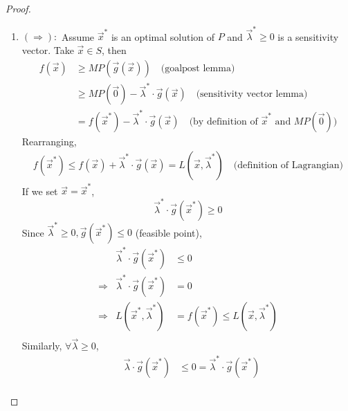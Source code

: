 \documentclass[11pt,a4paper]{article}
\begin{document}
\begin{proof}\quad
    \begin{enumerate}[$\bullet$]
        \item $(\Rightarrow):$ Assume $\vec{x}^*$ is an optimal solution of $P$ and $\vec{\lambda}^*\geq 0$ is a sensitivity vector. Take $\vec{x}\in S$, then
        \begin{equation}
            \begin{aligned}
                f(\vec{x})&\geq MP(\vec{g}(\vec{x}))\quad \text{(goalpost lemma)}\\
                &\geq MP(\vec{0})-\vec{\lambda}^*\cdot \vec{g}(\vec{x})\quad \text{(sensitivity vector lemma)}\\
                &=f(\vec{x}^*)-\vec{\lambda}^*\cdot \vec{g}(\vec{x})\quad \text{(by definition of $\vec{x}^*$ and $MP(\vec{0})$)}
            \end{aligned}
            \nonumber
        \end{equation}
        Rearranging,
        \begin{equation}
            \begin{aligned}
                f(\vec{x}^*)\leq f(\vec{x})+\vec{\lambda}^*\cdot \vec{g}(\vec{x})=L(\vec{x},\vec{\lambda}^*)\quad \text{(definition of Lagrangian)}
            \end{aligned}
            \nonumber
        \end{equation}
        If we set $\vec{x}=\vec{x}^*$, $$\vec{\lambda}^*\cdot \vec{g}(\vec{x}^*)\geq 0$$
        Since $\vec{\lambda}^*\geq 0, \vec{g}(\vec{x}^*)\leq 0$ (feasible point),
        \begin{equation}
            \begin{aligned}
                &&\vec{\lambda}^*\cdot \vec{g}(\vec{x}^*)&\leq 0&\\
               &\Rightarrow& \vec{\lambda}^*\cdot \vec{g}(\vec{x}^*)&= 0&\\
               &\Rightarrow& L(\vec{x}^*,\vec{\lambda}^*)&=f(\vec{x}^*)\leq L(\vec{x},\vec{\lambda}^*)&\\
            \end{aligned}
            \nonumber
        \end{equation}
        Similarly, $\forall \vec{\lambda}\geq 0$,
        \begin{equation}
            \begin{aligned}
                &&\vec{\lambda}\cdot \vec{g}(\vec{x}^*)&\leq 0=\vec{\lambda}^*\cdot \vec{g}(\vec{x}^*)&\\

\end{aligned}
\end{equation}
\end{enumerate}
\end{proof}
\end{document}
